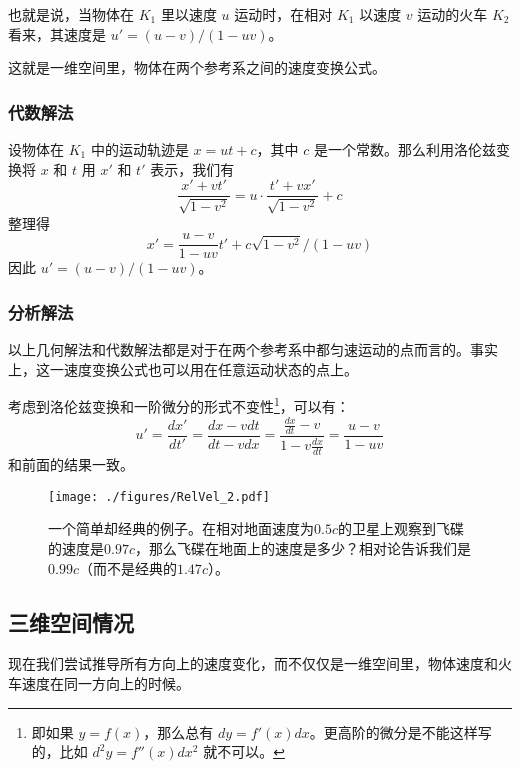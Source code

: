 也就是说，当物体在 $K_1$ 里以速度 $u$ 运动时，在相对 $K_1$ 以速度 $v$ 运动的火车 $K_2$ 看来，其速度是 $u'=(u-v)/(1-uv)$。

这就是一维空间里，物体在两个参考系之间的速度变换公式。

\subsubsection{代数解法}

设物体在 $K_1$ 中的运动轨迹是 $x=ut+c$，其中 $c$ 是一个常数。那么利用洛伦兹变换将 $x$ 和 $t$ 用 $x'$ 和 $t'$ 表示，我们有
\begin{equation}
\frac{x'+vt'}{\sqrt{1-v^2}}=u\cdot\frac{t'+vx'}{\sqrt{1-v^2}}+c
\end{equation}
整理得
\begin{equation}
x'=\frac{u-v}{1-uv}t'+c\sqrt{1-v^2}/(1-uv)
\end{equation}
因此 $u'=(u-v)/(1-uv)$。

\subsubsection{分析解法}

以上几何解法和代数解法都是对于在两个参考系中都匀速运动的点而言的。事实上，这一速度变换公式也可以用在任意运动状态的点上。

考虑到洛伦兹变换和一阶微分的形式不变性\footnote{即如果 $y=f(x)$，那么总有 $dy=f'(x)dx$。更高阶的微分是不能这样写的，比如 $d^2y=f''(x)dx^2$ 就不可以。}，可以有：
\begin{equation}
u'=\frac{dx'}{dt'}=\frac{dx-vdt}{dt-vdx}=\frac{\frac{dx}{dt}-v}{1-v\frac{dx}{dt}}=\frac{u-v}{1-uv}
\end{equation}
和前面的结果一致。

\begin{figure}[ht]
\centering
\texttt{[image: ./figures/RelVel\_2.pdf]}
\caption{一个简单却经典的例子。在相对地面速度为$0.5c$的卫星上观察到飞碟的速度是$0.97c$，那么飞碟在地面上的速度是多少？相对论告诉我们是$0.99c$（而不是经典的$1.47c$）。} \label{RelVel_fig2}
\end{figure}

\subsection{三维空间情况}

现在我们尝试推导所有方向上的速度变化，而不仅仅是一维空间里，物体速度和火车速度在同一方向上的时候。

